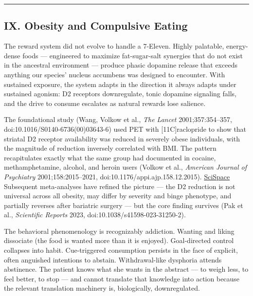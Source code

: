 \begin{center}\rule{0.5\linewidth}{0.5pt}\end{center}

\subsection{IX. Obesity and Compulsive Eating}\label{09_dopamine_spectrum-ix.-obesity-and-compulsive-eating}

The reward system did not evolve to handle a 7-Eleven. Highly palatable, energy-dense foods --- engineered to maximize fat-sugar-salt synergies that do not exist in the ancestral environment --- produce phasic dopamine release that exceeds anything our species' nucleus accumbens was designed to encounter. With sustained exposure, the system adapts in the direction it always adapts under sustained agonism: D2 receptors downregulate, tonic dopamine signaling falls, and the drive to consume escalates as natural rewards lose salience.

The foundational study (Wang, Volkow et al., \emph{The Lancet} 2001;357:354--357, doi:10.1016/S0140-6736(00)03643-6) used PET with {[}11C{]}raclopride to show that striatal D2 receptor availability was reduced in severely obese individuals, with the magnitude of reduction inversely correlated with BMI. The pattern recapitulates exactly what the same group had documented in cocaine, methamphetamine, alcohol, and heroin users (Volkow et al., \emph{American Journal of Psychiatry} 2001;158:2015--2021, doi:10.1176/appi.ajp.158.12.2015). \href{https://scispace.com/papers/low-level-of-brain-dopamine-d2-receptors-in-methamphetamine-1xd66wjze9}{SciSpace} Subsequent meta-analyses have refined the picture --- the D2 reduction is not universal across all obesity, may differ by severity and binge phenotype, and partially reverses after bariatric surgery --- but the core finding survives (Pak et al., \emph{Scientific Reports} 2023, doi:10.1038/s41598-023-31250-2).

The behavioral phenomenology is recognizably addiction. Wanting and liking dissociate (the food is wanted more than it is enjoyed). Goal-directed control collapses into habit. Cue-triggered consumption persists in the face of explicit, often anguished intentions to abstain. Withdrawal-like dysphoria attends abstinence. The patient knows what she wants in the abstract --- to weigh less, to feel better, to stop --- and cannot translate that knowledge into action because the relevant translation machinery is, biologically, downregulated.

